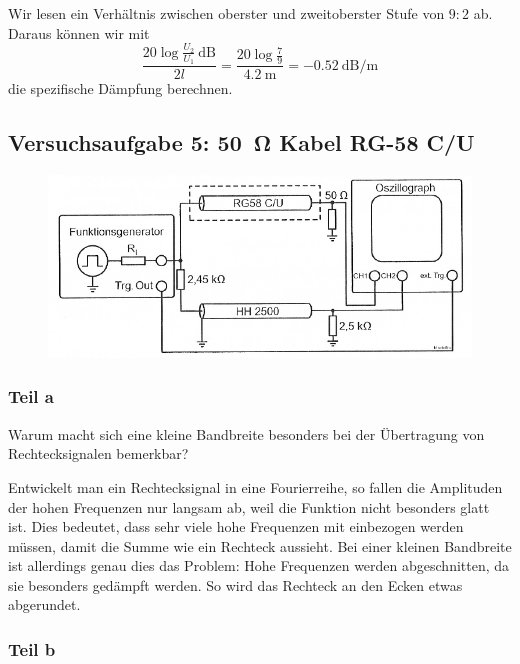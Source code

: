 Wir lesen ein Verhältnis zwischen oberster und zweitoberster Stufe von $9 : 2$
ab. Daraus können wir mit
\[\frac{20\log\frac{U_2}{U_1}\SI{}{\deci\bel}}{2l} = \frac{20\log\frac79}{\SI{4.2}{\meter}} = \SI{-0.52}{\deci\bel\per\meter}\]
die spezifische Dämpfung berechnen.

\FloatBarrier
\subsection{Versuchsaufgabe 5: \SI{50}{\ohm} Kabel RG-58 C/U}

\begin{figure}[htbp]
	\centering
	\includegraphics[width=\textwidth]{Schaltplan/1-11.png}
	\caption{%
		\cite[Abbildung~1.11]{physik313-Anleitung}
	}
	\label{fig:1-11}
\end{figure}

\subsubsection{Teil a}

\begin{problem}
	Warum macht sich eine kleine Bandbreite besonders bei der Übertragung von
	Rechtecksignalen bemerkbar?
\end{problem}

Entwickelt man ein Rechtecksignal in eine Fourierreihe, so fallen die
Amplituden der hohen Frequenzen nur langsam ab, weil die Funktion nicht
besonders glatt ist. Dies bedeutet, dass sehr viele hohe Frequenzen mit
einbezogen werden müssen, damit die Summe wie ein Rechteck aussieht. Bei einer
kleinen Bandbreite ist allerdings genau dies das Problem: Hohe Frequenzen
werden abgeschnitten, da sie besonders gedämpft werden. So wird das Rechteck an
den Ecken etwas abgerundet.

\subsubsection{Teil b}

